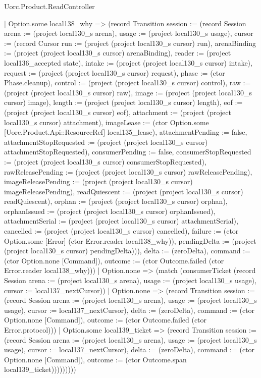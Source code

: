 \begin{lexlean}{Uorc.Product.ReadController}
\begin{semanticmodule}
{        | Option.some local138_why => (record Transition {session := (record Session {arena := (project local130_s arena), usage := (project local130_s usage), cursor := (record Cursor {run := (project (project local130_s cursor) run), arenaBinding := (project (project local130_s cursor) arenaBinding), reader := (project local136_accepted state), intake := (project (project local130_s cursor) intake), request := (project (project local130_s cursor) request), phase := (ctor Phase.cleanup), control := (project (project local130_s cursor) control), raw := (project (project local130_s cursor) raw), image := (project (project local130_s cursor) image), length := (project (project local130_s cursor) length), eof := (project (project local130_s cursor) eof), attachment := (project (project local130_s cursor) attachment), imageLease := (ctor Option.some [Uorc.Product.Api::ResourceRef] local135_lease), attachmentPending := false, attachmentStopRequested := (project (project local130_s cursor) attachmentStopRequested), consumerPending := false, consumerStopRequested := (project (project local130_s cursor) consumerStopRequested), rawReleasePending := (project (project local130_s cursor) rawReleasePending), imageReleasePending := (project (project local130_s cursor) imageReleasePending), readQuiescent := (project (project local130_s cursor) readQuiescent), orphan := (project (project local130_s cursor) orphan), orphanIssued := (project (project local130_s cursor) orphanIssued), attachmentSerial := (project (project local130_s cursor) attachmentSerial), cancelled := (project (project local130_s cursor) cancelled), failure := (ctor Option.some [Error] (ctor Error.reader local138_why)), pendingDelta := (project (project local130_s cursor) pendingDelta)})}), delta := (zeroDelta), command := (ctor Option.none [Command]), outcome := (ctor Outcome.failed (ctor Error.reader local138_why))})
        | Option.none => (match (consumerTicket (record Session {arena := (project local130_s arena), usage := (project local130_s usage), cursor := local137_nextCursor}))
          | Option.none => (record Transition {session := (record Session {arena := (project local130_s arena), usage := (project local130_s usage), cursor := local137_nextCursor}), delta := (zeroDelta), command := (ctor Option.none [Command]), outcome := (ctor Outcome.failed (ctor Error.protocol))})
          | Option.some local139_ticket => (record Transition {session := (record Session {arena := (project local130_s arena), usage := (project local130_s usage), cursor := local137_nextCursor}), delta := (zeroDelta), command := (ctor Option.none [Command]), outcome := (ctor Outcome.span local139_ticket)}))))))))
}
\end{semanticmodule}
\end{lexlean}
